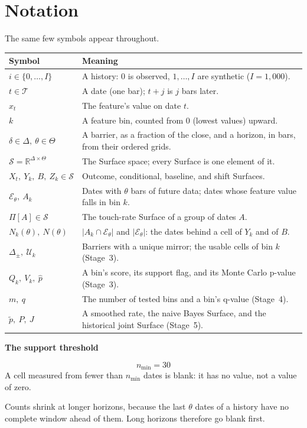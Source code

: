 \documentclass[11pt]{article}
\renewcommand{\arraystretch}{1.15}
\newenvironment{keyconcept}[1]{%
  \par\addvspace{8pt}\begin{lrbox}{\conceptbox}%
  \begin{minipage}{\dimexpr\linewidth-24pt\relax}%
  \setlength{\parindent}{0pt}%
  {\normalsize\bfseries\color{ConceptInk}#1\par}\large
}{%
  \end{minipage}\end{lrbox}%
  \noindent{\setlength{\fboxsep}{12pt}%
  \colorbox{ConceptPaper}{\usebox{\conceptbox}}}\par\addvspace{8pt}}
\begin{document}
\section{Notation}\label{sec:notation}

The same few symbols appear throughout.
\begin{center}
\renewcommand{\arraystretch}{1.3}
\begin{tabularx}{\linewidth}{@{}l >{\raggedright\arraybackslash}X@{}}
\toprule
\rowcolor{ConceptPaper}
\textbf{Symbol} & \textbf{Meaning} \\
\midrule
$i\in\{0,\ldots,I\}$ & A history: $0$ is observed, $1,\ldots,I$ are synthetic ($I=1{,}000$). \\
$t\in\mathcal T$ & A date (one bar); $t+j$ is $j$ bars later. \\
$x_t$ & The feature's value on date $t$. \\
$k$ & A feature bin, counted from $0$ (lowest values) upward. \\
$\delta\in\Delta,\ \theta\in\Theta$ & A barrier, as a fraction of the close, and a horizon, in bars, from their ordered grids. \\
$\mathcal S=\mathbb R^{\Delta\times\Theta}$ & The Surface space; every Surface is one element of it. \\
$X_t,\ Y_k,\ B,\ Z_k\in\mathcal S$ & Outcome, conditional, baseline, and shift Surfaces. \\
$\mathcal E_\theta,\ A_k$ & Dates with $\theta$ bars of future data; dates whose feature value falls in bin $k$. \\
$\Pi[A]\in\mathcal S$ & The touch-rate Surface of a group of dates $A$. \\
$N_k(\theta),\ N(\theta)$ & $|A_k\cap\mathcal E_\theta|$ and $|\mathcal E_\theta|$: the dates behind a cell of $Y_k$ and of $B$. \\
$\Delta_\pm,\ \mathcal U_k$ & Barriers with a unique mirror; the usable cells of bin $k$ (Stage~3). \\
$Q_k,\ V_k,\ \widehat p$ & A bin's score, its support flag, and its Monte Carlo p-value (Stage~3). \\
$m,\ q$ & The number of tested bins and a bin's q-value (Stage~4). \\
$\tilde p,\ P,\ J$ & A smoothed rate, the naive Bayes Surface, and the historical joint Surface (Stage~5). \\
\bottomrule
\end{tabularx}
\end{center}
\begin{keyconcept}{The support threshold}
\[
  n_{\min}=30
\]
\normalsize A cell measured from fewer than $n_{\min}$ dates is blank: it
has no value, not a value of zero.
\end{keyconcept}
Counts shrink at longer horizons, because the last $\theta$ dates of a
history have no complete window ahead of them. Long horizons therefore go
blank first.
\end{document}

